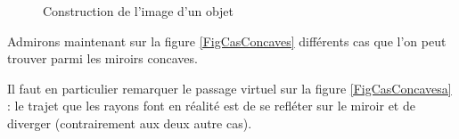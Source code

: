 \begin{figure}
{\label{FigConcUnCentre}
}
\caption{Construction de l'image d'un objet}  \label{FigConcUn}
\end{figure}

Admirons maintenant sur la figure \ref{FigCasConcaves} différents cas que l'on peut trouver parmi les miroirs concaves. 

Il faut en particulier remarquer le passage virtuel sur la figure \ref{FigCasConcavesa} : le trajet que les rayons font en réalité est de se refléter sur le miroir et de diverger (contrairement aux deux autre cas).

